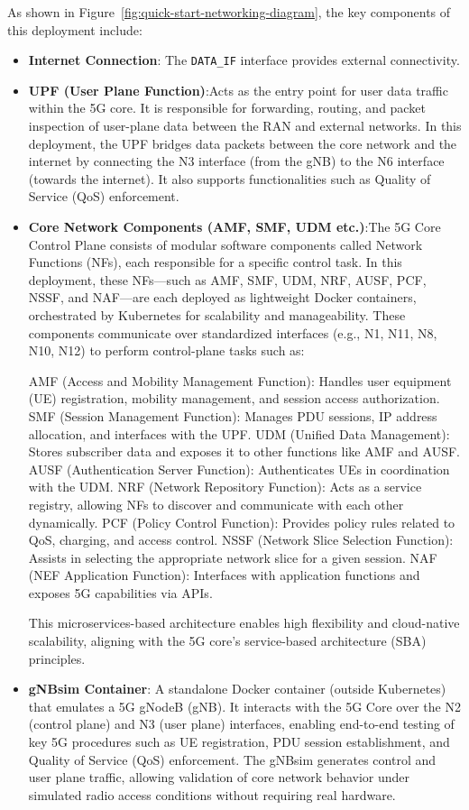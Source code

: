 As shown in Figure~\ref{fig:quick-start-networking-diagram}, the key components of this deployment include:
\begin{itemize}
    \item \textbf{Internet Connection}: The \texttt{DATA\_IF} interface provides external connectivity.
    \item \textbf{UPF (User Plane Function)}:Acts as the entry point for user data traffic within the 5G core. It is responsible for forwarding, routing, and packet inspection of user-plane data between the RAN and external networks. In this deployment, the UPF bridges data packets between the core network and the internet by connecting the N3 interface (from the gNB) to the N6 interface (towards the internet). It also supports functionalities such as Quality of Service (QoS) enforcement.
    \item \textbf{Core Network Components (AMF, SMF, UDM etc.)}:The 5G Core Control Plane consists of modular software components called Network Functions (NFs), each responsible for a specific control task. In this deployment, these NFs—such as AMF, SMF, UDM, NRF, AUSF, PCF, NSSF, and NAF—are each deployed as lightweight Docker containers, orchestrated by Kubernetes for scalability and manageability. These components communicate over standardized interfaces (e.g., N1, N11, N8, N10, N12) to perform control-plane tasks such as:

AMF (Access and Mobility Management Function): Handles user equipment (UE) registration, mobility management, and session access authorization.
SMF (Session Management Function): Manages PDU sessions, IP address allocation, and interfaces with the UPF.
UDM (Unified Data Management): Stores subscriber data and exposes it to other functions like AMF and AUSF.
AUSF (Authentication Server Function): Authenticates UEs in coordination with the UDM.
NRF (Network Repository Function): Acts as a service registry, allowing NFs to discover and communicate with each other dynamically.
PCF (Policy Control Function): Provides policy rules related to QoS, charging, and access control.
NSSF (Network Slice Selection Function): Assists in selecting the appropriate network slice for a given session.
NAF (NEF Application Function): Interfaces with application functions and exposes 5G capabilities via APIs.

This microservices-based architecture enables high flexibility and cloud-native scalability, aligning with the 5G core's service-based architecture (SBA) principles.

\item \textbf{gNBsim Container}: A standalone Docker container (outside Kubernetes) that emulates a 5G gNodeB (gNB). It interacts with the 5G Core over the N2 (control plane) and N3 (user plane) interfaces, enabling end-to-end testing of key 5G procedures such as UE registration, PDU session establishment, and Quality of Service (QoS) enforcement. The gNBsim generates control and user plane traffic, allowing validation of core network behavior under simulated radio access conditions without requiring real hardware.

\end{itemize}





